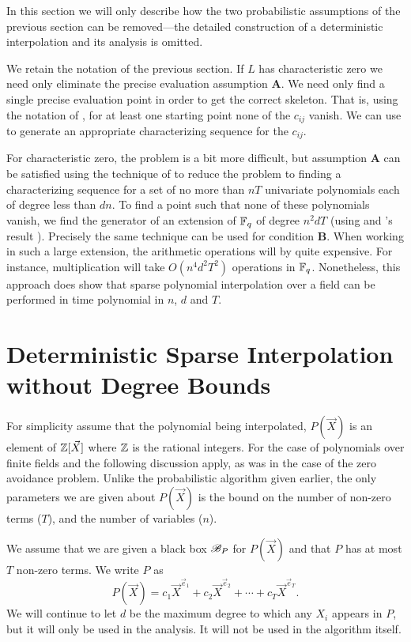In this section we will only describe how the two probabilistic
assumptions of the previous section can be removed---the detailed
construction of a deterministic interpolation and its analysis is
omitted.   

We retain the notation of the previous section.  If $L$ has
characteristic zero we need only eliminate the precise evaluation
assumption {\bf A}.  We need only find a single precise evaluation
point in order to get the correct skeleton.    That is, using the
notation of , for at least one starting
point none of the $c_{ij}$ vanish.  We can use
 to generate an appropriate characterizing
sequence for the $c_{ij}$.

For characteristic zero, the problem is a bit more difficult, but
assumption {\bf A} can be satisfied using the technique of
 to reduce the problem to finding a
characterizing sequence for a set of no more than $nT$ univariate
polynomials each of degree less than $dn$.  To find a point such that
none of these polynomials vanish, we find the generator of an
extension of $\mathbb{F}_q$ of degree $n^2dT$ (using {\Adleman} and
{\LenstraH}'s result \cite{Adleman86}).  Precisely the same technique
can be used for condition {\bf B}.  When working in such a large
extension, the arithmetic operations will by quite expensive.  For
instance, multiplication will take $O(n^4 d^2 T^2)$ operations in
$\mathbb{F}_q$.  Nonetheless, this approach does show that sparse polynomial
interpolation over a field can be performed in time polynomial in $n$,
$d$ and $T$.

\section{Deterministic Sparse Interpolation without Degree Bounds}
\label{Interp:BenOr:Sec}

For simplicity assume that the polynomial being interpolated, $P(\vec
X)$ is an element of $\mathbb{Z}[\vec X]$ where $\mathbb{Z}$ is the rational integers.
For the case of polynomials over finite fields
 and the following discussion apply, as was
in the case of the zero avoidance problem.  Unlike the probabilistic
algorithm given earlier, the only parameters we are given about
$P(\vec X)$ is the bound on the number of non-zero terms ($T$), and
the number of variables ($n$).

We assume that we are given a black box ${\cal B}_P$ for $P(\vec{X})$
and that $P$ has at most $T$ non-zero terms.  We write $P$ as
\[
P(\vec X) = c_1 {\vec X}^{\vec e_1} + c_2 {\vec X}^{\vec e_2} + \cdots +
c_T {\vec X}^{\vec e_T}.
\]
We will continue to let $d$ be the maximum degree to which any
$X_i$ appears in $P$, but it will only be used in the analysis.  It
will not be used in the algorithm itself.

